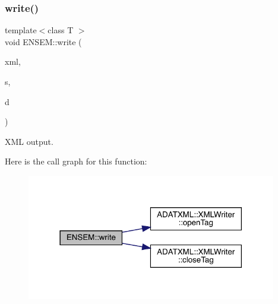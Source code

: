 \mbox{\label{namespaceENSEM_abde35864d26ad5898166c7b3377e5a61}} 
\subsubsection{\texorpdfstring{write()}{write()}\hspace{0.1cm}{\footnotesize\ttfamily [5/13]}}
{\footnotesize\ttfamily template$<$class T $>$ \\
void E\+N\+S\+E\+M\+::write (\begin{DoxyParamCaption}\item[{\mbox{\hyperlink{classADATXML_1_1XMLWriter}{A\+D\+A\+T\+X\+M\+L\+::\+X\+M\+L\+Writer}} \&}]{xml,  }\item[{const std\+::string \&}]{s,  }\item[{const \mbox{\hyperlink{classENSEM_1_1Ensem}{Ensem}}$<$ T $>$ \&}]{d }\end{DoxyParamCaption})\hspace{0.3cm}{\ttfamily [inline]}}



X\+ML output. 

Here is the call graph for this function\+:\nopagebreak
\begin{figure}[H]
\begin{center}
\leavevmode
\includegraphics[width=309pt]{d2/d94/namespaceENSEM_abde35864d26ad5898166c7b3377e5a61_cgraph}
\end{center}
\end{figure}
\mbox{\label{namespaceENSEM_a0cbc421b6e399674cc0f2faf6ca73e9e}} 
